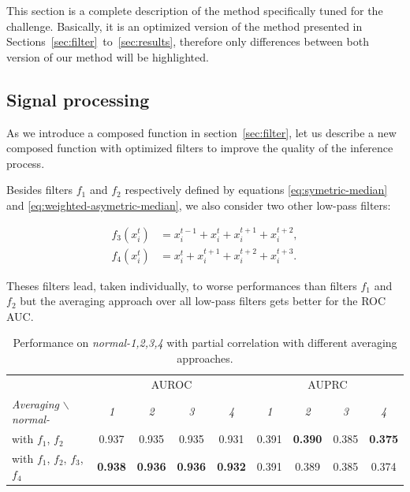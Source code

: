 \documentclass[wcp]{jmlr}
\begin{document}
This section is a complete description of the method specifically tuned for the challenge. Basically, it is an optimized version of the method presented in Sections~\ref{sec:filter}~to~\ref{sec:results}, therefore only differences between both version of our method will be highlighted.


\subsection*{Signal processing}

As we introduce a composed function in section~\ref{sec:filter}, let us describe a new composed function with optimized filters to improve the quality of the inference process.


Besides filters
$f_1$ and $f_2$ respectively defined by equations \ref{eq:symetric-median} and \ref{eq:weighted-asymetric-median}, we also consider two other low-pass
filters:

\begin{align}
f_3(x^t_i) &= x^{t-1}_i + x^{t}_i + x^{t+1}_i + x^{t+2}_i \label{eq:asymetric-median-forward}, \\
f_4(x^t_i) &=  x_i^t + x^{t+1}_i  + x^{t+2}_i + x^{t+3}_i  .
\label{eq:asymetric-median}
\end{align}

Theses filters lead, taken individually, to worse performances
 than filters $f_1$ and
$f_2$ but the averaging approach over all low-pass
filters gets better for the ROC AUC.

\begin{table}[ht]\label{tab:comparison}
\centering
\small
\begin{tabular}{| l | c c c c | c c c c |}
\hline
& \multicolumn{4}{c|}{AUROC} & \multicolumn{4}{c|}{AUPRC} \\
\textit{Averaging} $\backslash$ \textit{normal-} & \textit{1} & \textit{2} & \textit{3} & \textit{4} & \textit{1} & \textit{2} & \textit{3} & \textit{4} \\
\hline
\hline
 with $f_1$, $f_2$ & 0.937 & 0.935 & 0.935 & 0.931 & 0.391 &  \textbf{0.390} &  0.385 & \textbf{0.375}  \\
 with $f_1$, $f_2$, $f_3$, $f_4$ & \textbf{0.938} & \textbf{0.936} & \textbf{0.936} & \textbf{0.932} & 0.391 & 0.389 & 0.385 & 0.374\\
\hline
\end{tabular}
\caption{Performance on \textit{normal-1,2,3,4} with partial correlation with different averaging approaches.}
\end{table}
\end{document}
